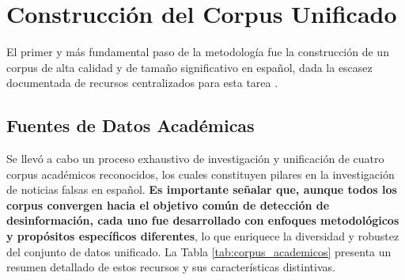 \section{Construcción del Corpus Unificado}
\label{sec:construccion_corpus}

El primer y más fundamental paso de la metodología fue la construcción de un corpus de alta calidad y de tamaño significativo en español, dada la escasez documentada de recursos centralizados para esta tarea \cite{hu2022deep}.


\subsection{Fuentes de Datos Académicas}

Se llevó a cabo un proceso exhaustivo de investigación y unificación de cuatro corpus académicos reconocidos, los cuales constituyen pilares en la investigación de noticias falsas en español. \textbf{Es importante señalar que, aunque todos los corpus convergen hacia el objetivo común de detección de desinformación, cada uno fue desarrollado con enfoques metodológicos y propósitos específicos diferentes}, lo que enriquece la diversidad y robustez del conjunto de datos unificado. La Tabla \ref{tab:corpus_academicos} presenta un resumen detallado de estos recursos y sus características distintivas.

